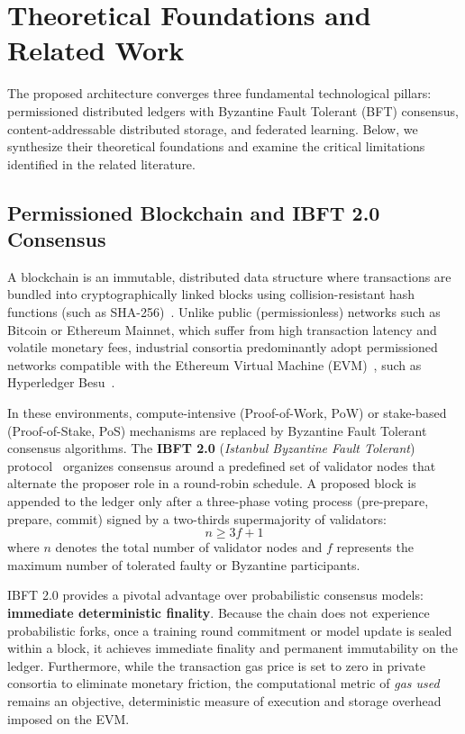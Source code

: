 \section{Theoretical Foundations and Related Work}
\label{sec:estado_arte}

The proposed architecture converges three fundamental technological pillars: permissioned distributed ledgers with Byzantine Fault Tolerant (BFT) consensus, content-addressable distributed storage, and federated learning. Below, we synthesize their theoretical foundations and examine the critical limitations identified in the related literature.

\subsection{Permissioned Blockchain and IBFT 2.0 Consensus}
A blockchain is an immutable, distributed data structure where transactions are bundled into cryptographically linked blocks using collision-resistant hash functions (such as SHA-256)~\cite{nist2015sha, zheng2018blockchain}. Unlike public (permissionless) networks such as Bitcoin or Ethereum Mainnet, which suffer from high transaction latency and volatile monetary fees, industrial consortia predominantly adopt permissioned networks compatible with the Ethereum Virtual Machine (EVM)~\cite{buterin2014ethereum}, such as Hyperledger Besu~\cite{besu_docs}.

In these environments, compute-intensive (Proof-of-Work, PoW) or stake-based (Proof-of-Stake, PoS) mechanisms are replaced by Byzantine Fault Tolerant consensus algorithms. The \textbf{IBFT 2.0} (\textit{Istanbul Byzantine Fault Tolerant}) protocol~\cite{moniz2020istanbul} organizes consensus around a predefined set of validator nodes that alternate the proposer role in a round-robin schedule. A proposed block is appended to the ledger only after a three-phase voting process (pre-prepare, prepare, commit) signed by a two-thirds supermajority of validators:
\begin{equation}
n \ge 3f + 1
\end{equation}
where $n$ denotes the total number of validator nodes and $f$ represents the maximum number of tolerated faulty or Byzantine participants.

IBFT 2.0 provides a pivotal advantage over probabilistic consensus models: \textbf{immediate deterministic finality}. Because the chain does not experience probabilistic forks, once a training round commitment or model update is sealed within a block, it achieves immediate finality and permanent immutability on the ledger. Furthermore, while the transaction gas price is set to zero in private consortia to eliminate monetary friction, the computational metric of \textit{gas used}~\cite{ethereum_gas} remains an objective, deterministic measure of execution and storage overhead imposed on the EVM.

